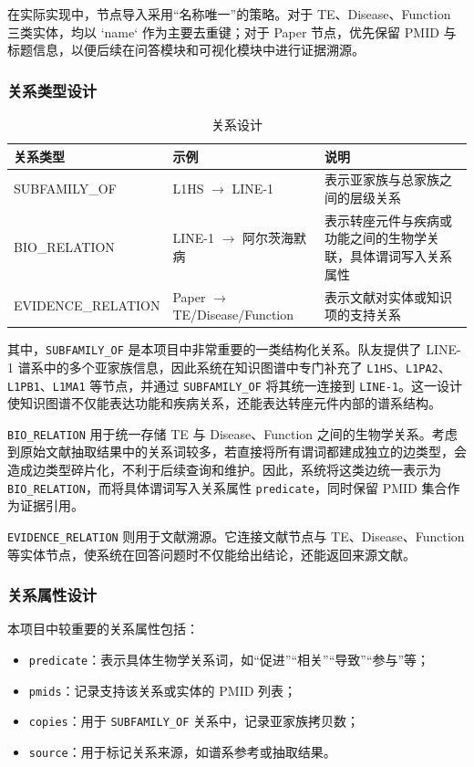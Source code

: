 在实际实现中，节点导入采用“名称唯一”的策略。对于 TE、Disease、Function 三类实体，均以 `name` 作为主要去重键；对于 Paper 节点，优先保留 PMID 与标题信息，以便后续在问答模块和可视化模块中进行证据溯源。

\subsubsection*{关系类型设计}

\begin{table}[H]
  \centering
  \caption{关系设计}
  \begin{tabular}{p{3cm} p{4cm} p{6cm}}
    \toprule
    关系类型 & 示例 & 说明 \\
    \midrule
    SUBFAMILY\_OF & L1HS $\rightarrow$ LINE-1 & 表示亚家族与总家族之间的层级关系 \\
    BIO\_RELATION & LINE-1 $\rightarrow$ 阿尔茨海默病 & 表示转座元件与疾病或功能之间的生物学关联，具体谓词写入关系属性 \\
    EVIDENCE\_RELATION & Paper $\rightarrow$ TE/Disease/Function & 表示文献对实体或知识项的支持关系 \\
    \bottomrule
  \end{tabular}
\end{table}

其中，\texttt{SUBFAMILY\_OF} 是本项目中非常重要的一类结构化关系。队友提供了 LINE-1 谱系中的多个亚家族信息，因此系统在知识图谱中专门补充了 \texttt{L1HS}、\texttt{L1PA2}、\texttt{L1PB1}、\texttt{L1MA1} 等节点，并通过 \texttt{SUBFAMILY\_OF} 将其统一连接到 \texttt{LINE-1}。这一设计使知识图谱不仅能表达功能和疾病关系，还能表达转座元件内部的谱系结构。

\texttt{BIO\_RELATION} 用于统一存储 TE 与 Disease、Function 之间的生物学关系。考虑到原始文献抽取结果中的关系词较多，若直接将所有谓词都建成独立的边类型，会造成边类型碎片化，不利于后续查询和维护。因此，系统将这类边统一表示为 \texttt{BIO\_RELATION}，而将具体谓词写入关系属性 \texttt{predicate}，同时保留 PMID 集合作为证据引用。

\texttt{EVIDENCE\_RELATION} 则用于文献溯源。它连接文献节点与 TE、Disease、Function 等实体节点，使系统在回答问题时不仅能给出结论，还能返回来源文献。

\subsubsection*{关系属性设计}

本项目中较重要的关系属性包括：

\begin{itemize}[leftmargin=2em]
  \item \texttt{predicate}：表示具体生物学关系词，如“促进”“相关”“导致”“参与”等；
  \item \texttt{pmids}：记录支持该关系或实体的 PMID 列表；
  \item \texttt{copies}：用于 \texttt{SUBFAMILY\_OF} 关系中，记录亚家族拷贝数；
  \item \texttt{source}：用于标记关系来源，如谱系参考或抽取结果。
\end{itemize}

